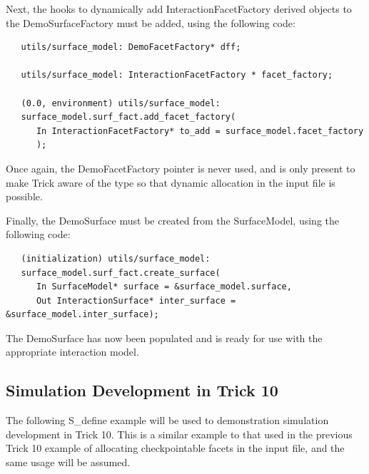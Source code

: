Next, the hooks to dynamically add InteractionFacetFactory derived
objects to the DemoSurfaceFactory must be added, using the following
code:

\begin{verbatim}
   utils/surface_model: DemoFacetFactory* dff;

   utils/surface_model: InteractionFacetFactory * facet_factory;

   (0.0, environment) utils/surface_model:
   surface_model.surf_fact.add_facet_factory(
      In InteractionFacetFactory* to_add = surface_model.facet_factory
      );
\end{verbatim}

Once again, the DemoFacetFactory pointer is never used, and is only
present to make Trick aware of the type so that dynamic allocation in the
input file is possible.

Finally, the DemoSurface must be created from the SurfaceModel, using
the following code:

\begin{verbatim}
   (initialization) utils/surface_model:
   surface_model.surf_fact.create_surface(
      In SurfaceModel* surface = &surface_model.surface,
      Out InteractionSurface* inter_surface = &surface_model.inter_surface);
\end{verbatim}

The DemoSurface has now been populated and is ready for use 
with the appropriate interaction model.


\subsection{Simulation Development in Trick 10}

The following S\_define example will be used to demonstration simulation development in Trick 10.
This is a similar example to that used in the previous Trick 10 example of allocating checkpointable
facets in the input file, and the same usage will be assumed.

